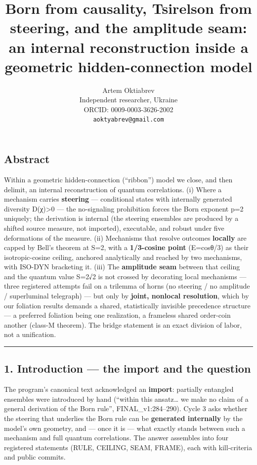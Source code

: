 \documentclass[
  11pt]{article}
\title{Born from causality, Tsirelson from steering, and the amplitude seam:\\[0.35em]
\large an internal reconstruction inside a geometric hidden-connection model}
\author{Artem Oktiabrev \\ Independent researcher, Ukraine \\
ORCID: 0009-0003-3626-2002 \\ \texttt{aoktyabrev@gmail.com}}
\date{}
\begin{document}
\maketitle

\subsection{Abstract}\label{abstract}

Within a geometric hidden-connection (``ribbon'') model we close, and
then delimit, an internal reconstruction of quantum correlations. (i)
Where a mechanism carries \textbf{steering} --- conditional states with
internally generated diversity D(χ)\textgreater0 --- the no-signaling
prohibition forces the Born exponent p=2 uniquely; the derivation is
internal (the steering ensembles are produced by a shifted source
measure, not imported), executable, and robust under five deformations
of the measure. (ii) Mechanisms that resolve outcomes \textbf{locally}
are capped by Bell's theorem at S=2, with a \textbf{1/3-cosine point}
(E=cosθ/3) as their isotropic-cosine ceiling, anchored analytically and
reached by two mechanisms, with ISO-DYN bracketing it. (iii) The
\textbf{amplitude seam} between that ceiling and the quantum value S=2√2
is not crossed by decorating local mechanisms --- three registered
attempts fail on a trilemma of horns (no steering / no amplitude /
superluminal telegraph) --- but only by \textbf{joint, nonlocal
resolution}, which by our foliation results demands a shared,
statistically invisible precedence structure --- a preferred foliation
being one realization, a frameless shared order-coin another (class-M
theorem). The bridge statement is an exact division of labor, not a
unification.

\begin{center}\rule{0.5\linewidth}{0.5pt}\end{center}

\subsection{1. Introduction --- the import and the
question}\label{introduction-the-import-and-the-question}

The program's canonical text acknowledged an \textbf{import}: partially
entangled ensembles were introduced by hand (``within this
ansatz\ldots{} we make no claim of a general derivation of the Born
rule'', FINAL\_v1:284--290). Cycle 3 asks whether the steering that
underlies the Born rule can be \textbf{generated internally} by the
model's own geometry, and --- once it is --- what exactly stands between
such a mechanism and full quantum correlations. The answer assembles
into four registered statements (RULE, CEILING, SEAM, FRAME), each with
kill-criteria and public commits.
\end{document}
